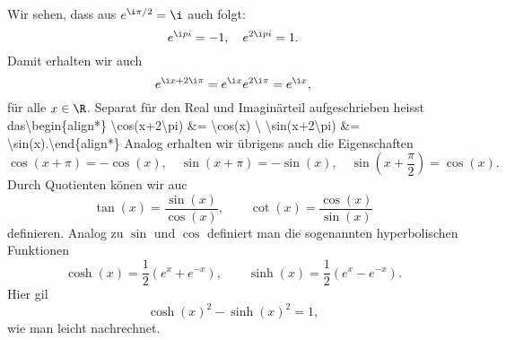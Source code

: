 \documentclass[letterpaper,10pt,english]{jupyterBook}
\begin{document}
Wir sehen, dass aus \( e^{\i \pi/2 } = \i\) auch folgt:
\begin{equation*}
 e^{\i pi} = -1, \quad e^{2 \i pi} =  1.
\end{equation*}
Damit erhalten wir auch
\begin{equation*}
 e^{\i x + 2 \i \pi} = e^{\i x}e^{2 \i \pi} = e^{\i x},
\end{equation*}
für alle \(x \in \R\). Separat für den Real  und Imaginärteil aufgeschrieben heisst das\textbackslash{}begin\{align*\}
\textbackslash{}cos(x+2\textbackslash{}pi) \&= \textbackslash{}cos(x) \textbackslash{}
\textbackslash{}sin(x+2\textbackslash{}pi) \&= \textbackslash{}sin(x).\textbackslash{}end\{align*\}
Analog erhalten wir übrigens auch die Eigenschaften
\begin{equation*}
 \cos(x+ \pi) = -\cos(x) , \quad  \sin(x+\pi) = - \sin(x), \quad \sin(x+\frac{\pi}2) = \cos(x).
\end{equation*}
Durch Quotienten könen wir auc
\begin{equation*}
 \tan(x) = \frac{\sin(x)}{\cos(x)} , \qquad \cot(x) = \frac{\cos(x)}{\sin(x)}
\end{equation*}
definieren.  Analog zu \(\sin\) und \(\cos\) definiert man die sogenannten hyperbolischen Funktionen
\begin{equation*}
 \cosh(x) = \frac{1}2 (e^x+e^{-x}), \qquad \sinh(x) = \frac{1}2 (e^x-e^{-x}).
\end{equation*}
Hier gil
\begin{equation*}
 \cosh(x)^2 - \sinh(x)^2 = 1,
\end{equation*}
wie man leicht nachrechnet.
\end{document}
